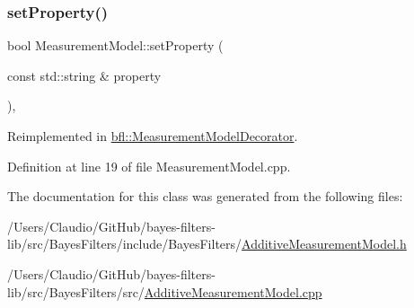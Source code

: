 \subsubsection{\texorpdfstring{set\+Property()}{setProperty()}}
{\footnotesize\ttfamily bool Measurement\+Model\+::set\+Property (\begin{DoxyParamCaption}\item[{const std\+::string \&}]{property }\end{DoxyParamCaption})\hspace{0.3cm}{\ttfamily [virtual]}, {\ttfamily [inherited]}}



Reimplemented in \mbox{\hyperlink{classbfl_1_1MeasurementModelDecorator_a531a891152d7bf83e56370664d54f42f}{bfl\+::\+Measurement\+Model\+Decorator}}.



Definition at line 19 of file Measurement\+Model.\+cpp.



The documentation for this class was generated from the following files\+:\begin{DoxyCompactItemize}
\item 
/\+Users/\+Claudio/\+Git\+Hub/bayes-\/filters-\/lib/src/\+Bayes\+Filters/include/\+Bayes\+Filters/\mbox{\hyperlink{AdditiveMeasurementModel_8h}{Additive\+Measurement\+Model.\+h}}\item 
/\+Users/\+Claudio/\+Git\+Hub/bayes-\/filters-\/lib/src/\+Bayes\+Filters/src/\mbox{\hyperlink{AdditiveMeasurementModel_8cpp}{Additive\+Measurement\+Model.\+cpp}}\end{DoxyCompactItemize}
